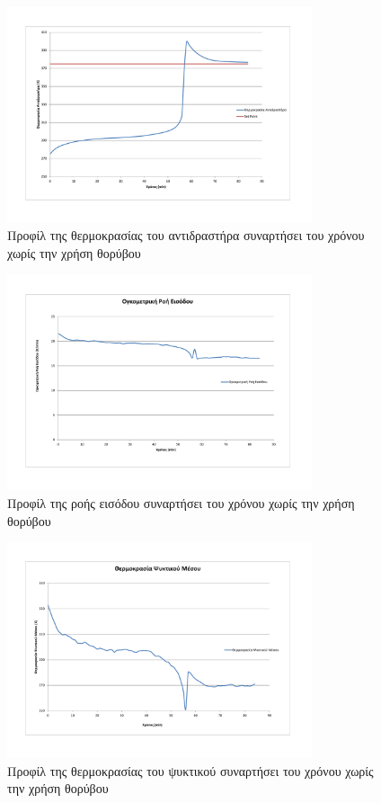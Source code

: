 \documentclass[11pt]{article} %
\numberwithin{equation}{subsection}
\begin{document}
\begin{figure}[H]
    \centering
    \includegraphics[width=0.8\textwidth]{no_noise_t.pdf}
    \caption{Προφίλ της θερμοκρασίας του αντιδραστήρα συναρτήσει του χρόνου χωρίς την χρήση θορύβου}
    \label{fig:no_noise_t}
\end{figure}

\begin{figure}[H]
    \centering
    \includegraphics[width=0.8\textwidth]{no_noise_f.pdf}
    \caption{Προφίλ της ροής εισόδου συναρτήσει του χρόνου χωρίς την χρήση θορύβου}
    \label{fig:no_noise_f}
\end{figure}

\begin{figure}[H]
    \centering
    \includegraphics[width=0.8\textwidth]{no_noise_t_cool.pdf}
    \caption{Προφίλ της θερμοκρασίας του ψυκτικού συναρτήσει του χρόνου χωρίς την χρήση θορύβου}
    \label{fig:noise_ca}
\end{figure}
\end{document}
